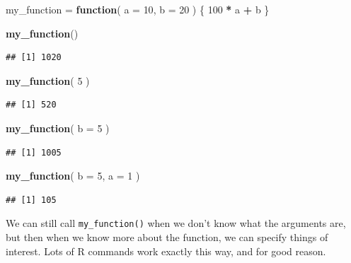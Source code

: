 \documentclass[
]{book}
\newenvironment{Shaded}{\begin{snugshade}}{\end{snugshade}}
\newcommand{\AttributeTok}[1]{\textcolor[rgb]{0.13,0.29,0.53}{#1}}
\newcommand{\ControlFlowTok}[1]{\textcolor[rgb]{0.13,0.29,0.53}{\textbf{#1}}}
\newcommand{\DecValTok}[1]{\textcolor[rgb]{0.00,0.00,0.81}{#1}}
\newcommand{\FunctionTok}[1]{\textcolor[rgb]{0.13,0.29,0.53}{\textbf{#1}}}
\newcommand{\NormalTok}[1]{#1}
\newcommand{\OtherTok}[1]{\textcolor[rgb]{0.56,0.35,0.01}{#1}}
\newcommand{\SpecialCharTok}[1]{\textcolor[rgb]{0.81,0.36,0.00}{\textbf{#1}}}
\begin{document}
\begin{Shaded}
\begin{Highlighting}[]
\NormalTok{my\_function }\OtherTok{=} \ControlFlowTok{function}\NormalTok{( }\AttributeTok{a =} \DecValTok{10}\NormalTok{, }\AttributeTok{b =} \DecValTok{20}\NormalTok{ ) \{}
     \DecValTok{100} \SpecialCharTok{*}\NormalTok{ a }\SpecialCharTok{+}\NormalTok{ b}
\NormalTok{\}}

\FunctionTok{my\_function}\NormalTok{()}
\end{Highlighting}
\end{Shaded}

\begin{verbatim}
## [1] 1020
\end{verbatim}

\begin{Shaded}
\begin{Highlighting}[]
\FunctionTok{my\_function}\NormalTok{( }\DecValTok{5}\NormalTok{ )}
\end{Highlighting}
\end{Shaded}

\begin{verbatim}
## [1] 520
\end{verbatim}

\begin{Shaded}
\begin{Highlighting}[]
\FunctionTok{my\_function}\NormalTok{( }\AttributeTok{b =} \DecValTok{5}\NormalTok{ )}
\end{Highlighting}
\end{Shaded}

\begin{verbatim}
## [1] 1005
\end{verbatim}

\begin{Shaded}
\begin{Highlighting}[]
\FunctionTok{my\_function}\NormalTok{( }\AttributeTok{b =} \DecValTok{5}\NormalTok{, }\AttributeTok{a =} \DecValTok{1}\NormalTok{ )}
\end{Highlighting}
\end{Shaded}

\begin{verbatim}
## [1] 105
\end{verbatim}

We can still call \texttt{my\_function()} when we don't know what the arguments are, but then when we know more about the function, we can specify things of interest.
Lots of R commands work exactly this way, and for good reason.
\end{document}
